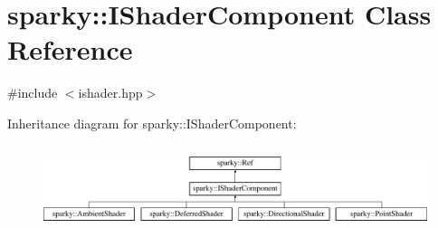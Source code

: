 \hypertarget{classsparky_1_1_i_shader_component}{}\section{sparky\+:\+:I\+Shader\+Component Class Reference}
\label{classsparky_1_1_i_shader_component}


{\ttfamily \#include $<$ishader.\+hpp$>$}

Inheritance diagram for sparky\+:\+:I\+Shader\+Component\+:\begin{figure}[H]
\begin{center}
\leavevmode
\includegraphics[height=2.456140cm]{classsparky_1_1_i_shader_component}
\end{center}
\end{figure}
